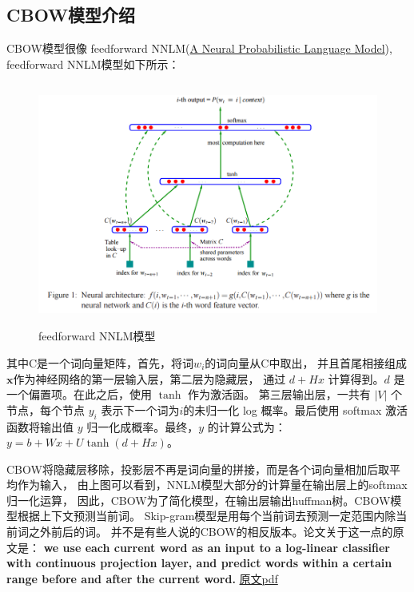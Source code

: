     \subsection{CBOW模型介绍}
    CBOW模型很像 feedforward NNLM(\href{http://jmlr.org/papers/volume3/bengio03a/bengio03a.pdf}{A Neural Probabilistic Language Model}),
    feedforward NNLM模型如下所示：
    \begin{figure}[h]
        \begin{center}
            \includegraphics[width=13cm,height=8cm]{2_2}
            \caption{feedforward NNLM模型}
        \end{center}
    \end{figure}

    其中C是一个词向量矩阵，首先，将词$w_i$的词向量从C中取出，
    并且首尾相接组成$\boldsymbol{x}$作为神经网络的第一层输入层，第二层为隐藏层，
    通过 $d+Hx$ 计算得到。$d$ 是一个偏置项。在此之后，使用 $\tanh$ 作为激活函。
    第三层输出层，一共有 $|V|$ 个节点，每个节点 $y_i$ 表示下一个词为$i$的未归一化 
    log 概率。最后使用 softmax 激活函数将输出值 
    $y$ 归一化成概率。最终，$y$ 的计算公式为：$y = b + Wx + U\tanh(d+Hx)$。


    CBOW将隐藏层移除，投影层不再是词向量的拼接，而是各个词向量相加后取平均作为输入，
    由上图可以看到，NNLM模型大部分的计算量在输出层上的softmax归一化运算，
    因此，CBOW为了简化模型，在输出层输出huffman树。CBOW模型根据上下文预测当前词。
    Skip-gram模型是用每个当前词去预测一定范围内除当前词之外前后的词。
    并不是有些人说的CBOW的相反版本。论文关于这一点的原文是：
    \textbf{we use each current word as an input to a log-linear classifier with continuous projection layer, and predict words within a certain range before and after the current word.} 
    \href{http://arxiv.org/pdf/1301.3781v3.pdf}{原文pdf}

